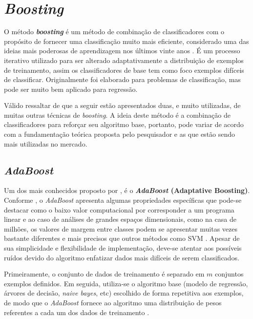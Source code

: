 \documentclass[
  openany]{book}
\begin{document}
\hypertarget{boost}{%
\section{\texorpdfstring{\emph{Boosting}}{Boosting}}\label{boost}}

O método \textbf{\emph{boosting}} \citep{freund1996experiments} é um método de combinação de classificadores com o propósito de fornecer uma classificação muito mais eficiente, considerado uma das ideias mais poderosas de aprendizagem nos últimos vinte anos \citep{hastie2009elements}. É um processo iterativo utilizado para ser alterado adaptativamente a distribuição de exemplos de treinamento, assim os classificadores de base tem como foco exemplos difíceis de classificar. Originalmente foi elaborado para problemas de classificação, mas pode ser muito bem aplicado para regressão.

Válido ressaltar de que a seguir estão apresentados duas, e muito utilizadas, de muitas outras técnicas de \emph{boosting}. A ideia deste método é a combinação de classificadores para reforçar seu algoritmo base, portanto, pode variar de acordo com a fundamentação teórica proposta pelo pesquisador e as que estão sendo mais utilizadas no mercado.

\hypertarget{adaboost}{%
\subsection{\texorpdfstring{\emph{AdaBoost}}{AdaBoost}}\label{adaboost}}

Um dos mais conhecidos proposto por \citet{freund1996experiments}, é o \textbf{\emph{AdaBoost} (Adaptative Boosting)}. Conforme \citep{freund1997decision}, o \emph{AdaBoost} apresenta algumas propriedades específicas que pode-se destacar como o baixo valor computacional por corresponder a um programa linear e ao caso de análises de grandes espaços dimensionais, como na casa de milhões, os valores de margem entre classes podem se apresentar muitas vezes bastante diferentes e mais precisos que outros métodos como SVM \citep{freund1999short, chaves2012estudo}. Apesar de sua simplicidade e flexibilidade de implementação, deve-se atentar aos possíveis ruídos devido do algoritmo enfatizar dados mais difíceis de serem classificados.

Primeiramente, o conjunto de dados de treinamento é separado em \(m\) conjuntos exemplos definidos. Em seguida, utiliza-se o algoritmo base (modelo de regressão, árvores de decisão, \emph{naive bayes}, etc) escolhido de forma repetitiva aos exemplos, de modo que o \emph{AdaBoost} fornece ao algoritmo uma distribuição de pesos referentes a cada um dos dados de treinamento \citep{chaves2012estudo}.
\end{document}
